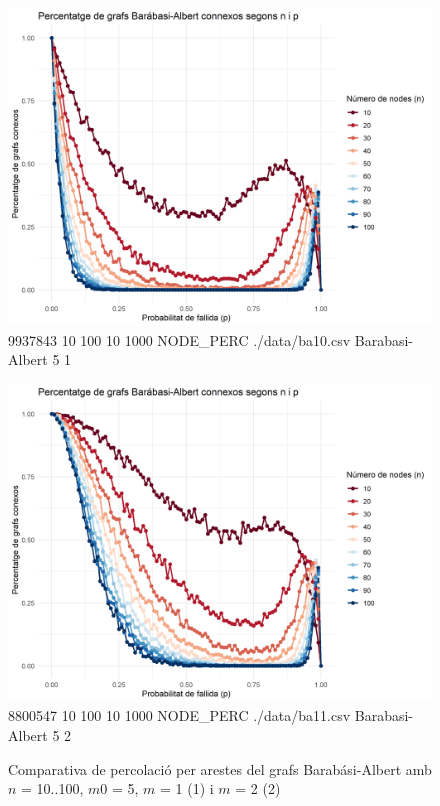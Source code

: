 \documentclass[a4paper]{article}
\begin{document}
	\begin{figure}[H]
		\centering
		\begin{minipage}{0.45\textwidth}
			\centering
			\includegraphics[width=\textwidth]{images/barabasi_10-100_5_1}
			\footnotesize{9937843 10 100 10 1000 NODE\_PERC ./data/ba10.csv Barabasi-Albert 5 1}
		\end{minipage}
		\hfill
		\begin{minipage}{0.45\textwidth}
			\centering
			\includegraphics[width=\textwidth]{images/barabasi_10-100_5_2}
			\footnotesize{8800547 10 100 10 1000 NODE\_PERC ./data/ba11.csv Barabasi-Albert 5 2}
		\end{minipage}
		\caption{Comparativa de percolació per arestes del grafs Barabási-Albert amb $n$ = 10..100, $m0$ = 5, $m$ = 1 (1) i $m$ = 2 (2)}
		\label{fig:percolation_nodes_ba_5_x}
	\end{figure}
	
\end{document}
